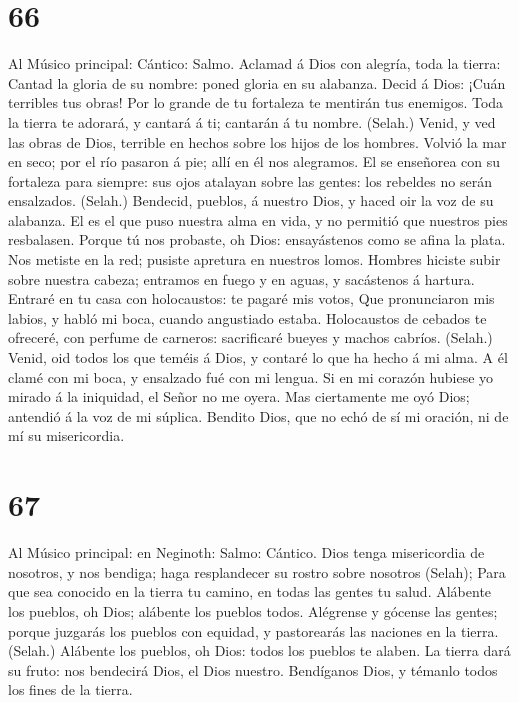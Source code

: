 \hypertarget{section-65}{%
\section{66}\label{section-65}}

 Al Músico principal: Cántico: Salmo. Aclamad á Dios con
alegría, toda la tierra:  Cantad la gloria de su nombre:
poned gloria en su alabanza.  Decid á Dios: ¡Cuán
terribles tus obras! Por lo grande de tu fortaleza te mentirán tus
enemigos.  Toda la tierra te adorará, y cantará á ti;
cantarán á tu nombre. (Selah.)  Venid, y ved las obras de
Dios, terrible en hechos sobre los hijos de los hombres. 
Volvió la mar en seco; por el río pasaron á pie; allí en él nos
alegramos.  El se enseñorea con su fortaleza para siempre:
sus ojos atalayan sobre las gentes: los rebeldes no serán ensalzados.
(Selah.)  Bendecid, pueblos, á nuestro Dios, y haced oir
la voz de su alabanza.  El es el que puso nuestra alma en
vida, y no permitió que nuestros pies resbalasen.  Porque
tú nos probaste, oh Dios: ensayástenos como se afina la plata.
 Nos metiste en la red; pusiste apretura en nuestros
lomos.  Hombres hiciste subir sobre nuestra cabeza;
entramos en fuego y en aguas, y sacástenos á hartura. 
Entraré en tu casa con holocaustos: te pagaré mis votos, 
Que pronunciaron mis labios, y habló mi boca, cuando angustiado estaba.
 Holocaustos de cebados te ofreceré, con perfume de
carneros: sacrificaré bueyes y machos cabríos. (Selah.) 
Venid, oid todos los que teméis á Dios, y contaré lo que ha hecho á mi
alma.  A él clamé con mi boca, y ensalzado fué con mi
lengua.  Si en mi corazón hubiese yo mirado á la
iniquidad, el Señor no me oyera.  Mas ciertamente me oyó
Dios; antendió á la voz de mi súplica.  Bendito Dios, que
no echó de sí mi oración, ni de mí su misericordia.

\hypertarget{section-66}{%
\section{67}\label{section-66}}

 Al Músico principal: en Neginoth: Salmo: Cántico. Dios
tenga misericordia de nosotros, y nos bendiga; haga resplandecer su
rostro sobre nosotros (Selah);  Para que sea conocido en
la tierra tu camino, en todas las gentes tu salud. 
Alábente los pueblos, oh Dios; alábente los pueblos todos.
 Alégrense y gócense las gentes; porque juzgarás los
pueblos con equidad, y pastorearás las naciones en la tierra. (Selah.)
 Alábente los pueblos, oh Dios: todos los pueblos te
alaben.  La tierra dará su fruto: nos bendecirá Dios, el
Dios nuestro.  Bendíganos Dios, y témanlo todos los fines
de la tierra.

